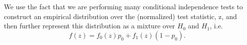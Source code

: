 \documentclass{article} %
\begin{document}
We use the fact that we are performing many conditional independence tests to construct an empirical distribution over the (normalized) test statistic, z, and then further represent this distribution as a mixture over $H_0$ and $H_1$, i.e. $$f(z) = f_0(z)p_0 + f_1(z)(1 - p_0).$$






\begin{small}

%
%

\end{small}
\end{document}
